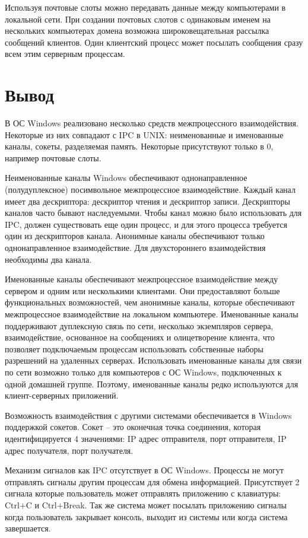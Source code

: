 \documentclass[a4paper]{article}
\begin{document}
	Используя почтовые слоты можно передавать данные между компьютерами в локальной сети. При создании почтовых слотов с одинаковым именем на нескольких компьютерах домена возможна широковещательная рассылка сообщений клиентов. Один клиентский процесс может посылать сообщения сразу всем этим серверным процессам.

\section{Вывод}
	В ОС Windows реализовано несколько средств межпроцессного взаимодействия. Некоторые из них совпадают с IPC в UNIX: неименованные и именованные каналы, сокеты, разделяемая память. Некоторые присутствуют только в 0, например почтовые слоты.
	
	Неименованные каналы Windows обеспечивают однонаправленное (полудуплексное) посимвольное межпроцессное взаимодействие. Каждый канал имеет два дескриптора: дескриптор чтения и дескриптор записи. Дескрипторы каналов часто бывают наследуемыми. Чтобы канал можно было использовать для IPC, должен существовать еще один процесс, и для этого процесса требуется один из дескрипторов канала. 
Анонимные каналы обеспечивают только однонаправленное взаимодействие. Для двухстороннего взаимодействия необходимы два канала. 

	Именованные каналы обеспечивают межпроцессное взаимодействие между сервером и одним или несколькими клиентами. Они предоставляют больше функциональных возможностей, чем анонимные каналы, которые обеспечивают межпроцессное взаимодействие на локальном компьютере. Именованные каналы поддерживают дуплексную связь по сети, несколько экземпляров сервера, взаимодействие, основанное на сообщениях и олицетворение клиента, что позволяет подключаемым процессам использовать собственные наборы разрешений на удаленных серверах. Использовать именованные каналы для связи по сети возможно только для компьютеров с ОС Windows, подключенных к одной домашней группе. Поэтому, именованные каналы редко используются для клиент-серверных приложений.
	
	Возможность взаимодействия с другими системами обеспечивается в Windows поддержкой сокетов. Сокет – это оконечная точка соединения, которая идентифицируется 4 значениями: IP адрес отправителя, порт отправителя, IP адрес получателя, порт получателя. 
	
	Механизм сигналов как IPC отсутствует в ОС Windows. Процессы не могут отправлять сигналы другим процессам для обмена информацией. Присутствует 2 сигнала которые пользователь может отправлять приложению с клавиатуры: Ctrl+C и Ctrl+Break. Так же система может посылать приложению сигналы когда пользователь закрывает консоль, выходит из системы или когда система завершается.
	
\end{document}
